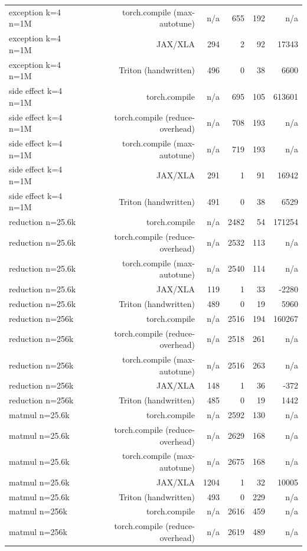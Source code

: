 \begin{tabular}{lrrrrr}
exception k=4 n=1M & torch.compile (max-autotune) & n/a & 655 & 192 & n/a \\
exception k=4 n=1M & JAX/XLA & 294 & 2 & 92 & 17343 \\
exception k=4 n=1M & Triton (handwritten) & 496 & 0 & 38 & 6600 \\
side effect k=4 n=1M & torch.compile & n/a & 695 & 105 & 613601 \\
side effect k=4 n=1M & torch.compile (reduce-overhead) & n/a & 708 & 193 & n/a \\
side effect k=4 n=1M & torch.compile (max-autotune) & n/a & 719 & 193 & n/a \\
side effect k=4 n=1M & JAX/XLA & 291 & 1 & 91 & 16942 \\
side effect k=4 n=1M & Triton (handwritten) & 491 & 0 & 38 & 6529 \\
reduction n=25.6k & torch.compile & n/a & 2482 & 54 & 171254 \\
reduction n=25.6k & torch.compile (reduce-overhead) & n/a & 2532 & 113 & n/a \\
reduction n=25.6k & torch.compile (max-autotune) & n/a & 2540 & 114 & n/a \\
reduction n=25.6k & JAX/XLA & 119 & 1 & 33 & -2280 \\
reduction n=25.6k & Triton (handwritten) & 489 & 0 & 19 & 5960 \\
reduction n=256k & torch.compile & n/a & 2516 & 194 & 160267 \\
reduction n=256k & torch.compile (reduce-overhead) & n/a & 2518 & 261 & n/a \\
reduction n=256k & torch.compile (max-autotune) & n/a & 2516 & 263 & n/a \\
reduction n=256k & JAX/XLA & 148 & 1 & 36 & -372 \\
reduction n=256k & Triton (handwritten) & 485 & 0 & 19 & 1442 \\
matmul n=25.6k & torch.compile & n/a & 2592 & 130 & n/a \\
matmul n=25.6k & torch.compile (reduce-overhead) & n/a & 2629 & 168 & n/a \\
matmul n=25.6k & torch.compile (max-autotune) & n/a & 2675 & 168 & n/a \\
matmul n=25.6k & JAX/XLA & 1204 & 1 & 32 & 10005 \\
matmul n=25.6k & Triton (handwritten) & 493 & 0 & 229 & n/a \\
matmul n=256k & torch.compile & n/a & 2616 & 459 & n/a \\
matmul n=256k & torch.compile (reduce-overhead) & n/a & 2619 & 489 & n/a \\

\end{tabular}
